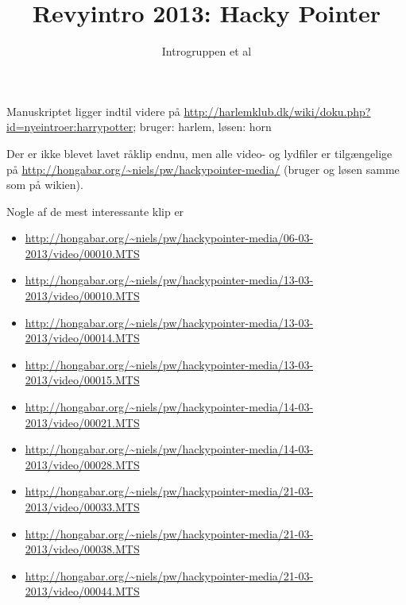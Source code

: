 \documentclass[a4paper,11pt]{article}
\title{Revyintro 2013: Hacky Pointer}
\author{Introgruppen et al}
\begin{document}
\maketitle

\begin{sketch}

Manuskriptet ligger indtil videre på
\url{http://harlemklub.dk/wiki/doku.php?id=nyeintroer:harrypotter}; bruger:
harlem, løsen: horn

Der er ikke blevet lavet råklip endnu, men alle video- og lydfiler er
tilgængelige på \url{http://hongabar.org/~niels/pw/hackypointer-media/}
(bruger og løsen samme som på wikien).

Nogle af de mest interessante klip er
\begin{itemize}
\item \url{http://hongabar.org/~niels/pw/hackypointer-media/06-03-2013/video/00010.MTS}
\item \url{http://hongabar.org/~niels/pw/hackypointer-media/13-03-2013/video/00010.MTS}
\item \url{http://hongabar.org/~niels/pw/hackypointer-media/13-03-2013/video/00014.MTS}
\item \url{http://hongabar.org/~niels/pw/hackypointer-media/13-03-2013/video/00015.MTS}
\item \url{http://hongabar.org/~niels/pw/hackypointer-media/14-03-2013/video/00021.MTS}
\item \url{http://hongabar.org/~niels/pw/hackypointer-media/14-03-2013/video/00028.MTS}
\item \url{http://hongabar.org/~niels/pw/hackypointer-media/21-03-2013/video/00033.MTS}
\item \url{http://hongabar.org/~niels/pw/hackypointer-media/21-03-2013/video/00038.MTS}
\item \url{http://hongabar.org/~niels/pw/hackypointer-media/21-03-2013/video/00044.MTS}
\end{itemize}

\end{sketch}
\end{document}
